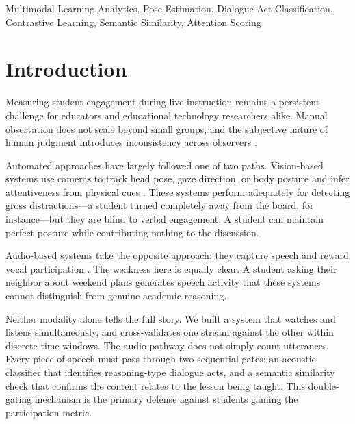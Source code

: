 \documentclass[conference]{IEEEtran}
\begin{document}
\begin{IEEEkeywords}
Multimodal Learning Analytics, Pose Estimation, Dialogue Act Classification, Contrastive Learning, Semantic Similarity, Attention Scoring
\end{IEEEkeywords}

\section{Introduction}

Measuring student engagement during live instruction remains a persistent challenge for educators and educational technology researchers alike. Manual observation does not scale beyond small groups, and the subjective nature of human judgment introduces inconsistency across observers \cite{dewan2019}.

Automated approaches have largely followed one of two paths. Vision-based systems use cameras to track head pose, gaze direction, or body posture and infer attentiveness from physical cues \cite{zaletelj2017}.
These systems perform adequately for detecting gross distractions---a student turned completely away from the board, for instance---but they are blind to verbal engagement. A student can maintain perfect posture while contributing nothing to the discussion.

Audio-based systems take the opposite approach: they capture speech and reward vocal participation \cite{suresh2022}.
The weakness here is equally clear. A student asking their neighbor about weekend plans generates speech activity that these systems cannot distinguish from genuine academic reasoning.

Neither modality alone tells the full story. We built a system that watches and listens simultaneously, and cross-validates one stream against the other within discrete time windows. The audio pathway does not simply count utterances. Every piece of speech must pass through two sequential gates: an acoustic classifier that identifies reasoning-type dialogue acts, and a semantic similarity check that confirms the content relates to the lesson being taught. This double-gating mechanism is the primary defense against students gaming the participation metric.
\end{document}
